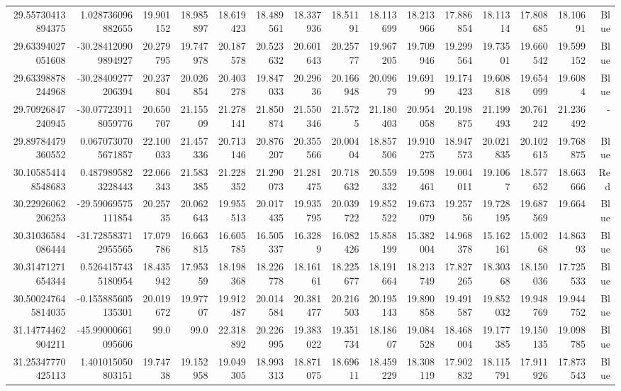 \begin{center}
\begin{longtable}{rrrrrrrrrrrrrrr}
29.55730413894375 & 1.028736096882655 & 19.901152 & 18.985897 & 18.619423 & 18.489561 & 18.337936 & 18.51191 & 18.113699 & 18.213966 & 17.886854 & 18.11314 & 17.808685 & 18.10691 & Blue \\
29.63394027051608 & -30.284120909894927 & 20.279795 & 19.747978 & 20.187578 & 20.523632 & 20.601643 & 20.25777 & 19.967205 & 19.709946 & 19.299564 & 19.73501 & 19.660542 & 19.599152 & Blue \\
29.63398878244968 & -30.28409277206394 & 20.237804 & 20.026854 & 20.403278 & 19.847033 & 20.29636 & 20.166948 & 20.09679 & 19.69199 & 19.174423 & 19.608818 & 19.654099 & 19.6084 & Blue \\
29.70926847240945 & -30.077239118059776 & 20.650707 & 21.15509 & 21.278141 & 21.850874 & 21.550346 & 21.5725 & 21.180403 & 20.954058 & 20.198875 & 21.199493 & 20.761242 & 21.236492 & - \\
29.89784479360552 & 0.0670730705671857 & 22.100033 & 21.457336 & 20.713146 & 20.876207 & 20.355566 & 20.00404 & 18.857506 & 19.910275 & 18.947573 & 20.021835 & 20.102615 & 19.768875 & Blue \\
30.105854148548683 & 0.4879895823228443 & 22.066343 & 21.583385 & 21.228352 & 21.290073 & 21.281475 & 20.718632 & 20.559332 & 19.598461 & 19.004011 & 19.1067 & 18.577652 & 18.663666 & Red \\
30.22926062206253 & -29.59069575111854 & 20.25735 & 20.062643 & 19.955513 & 20.017435 & 19.935795 & 20.039722 & 19.852522 & 19.673079 & 19.25756 & 19.728195 & 19.687569 & 19.664 & Blue \\
30.31036584086444 & -31.728583712955565 & 17.079786 & 16.663815 & 16.605785 & 16.505337 & 16.3289 & 16.082426 & 15.858199 & 15.382004 & 14.968378 & 15.162161 & 15.00268 & 14.86393 & Blue \\
30.31471271654344 & 0.5264157435180954 & 18.435942 & 17.95359 & 18.198368 & 18.226778 & 18.16161 & 18.225677 & 18.191664 & 18.213749 & 17.827265 & 18.30368 & 18.150036 & 17.725533 & Blue \\
30.500247645814035 & -0.155885605135301 & 20.019672 & 19.97707 & 19.912487 & 20.014584 & 20.381477 & 20.216503 & 20.195143 & 19.890858 & 19.491587 & 19.852032 & 19.948769 & 19.944752 & Blue \\
31.14774462904211 & -45.99000661095606 & 99.0 & 99.0 & 22.318892 & 20.226995 & 19.383022 & 19.351734 & 18.18607 & 19.084528 & 18.468004 & 19.177385 & 19.150135 & 19.098785 & Blue \\
31.25347770425113 & 1.401015050803151 & 19.74738 & 19.152958 & 19.049305 & 18.993313 & 18.871075 & 18.69611 & 18.459229 & 18.308119 & 17.902832 & 18.115791 & 17.911926 & 17.873543 & Blue \\

\end{longtable}
\end{center}
